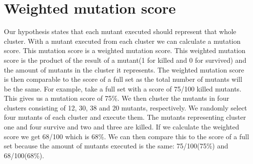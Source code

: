 \documentclass[../main]{subfiles}
\begin{document}
\section{Weighted mutation score}
\label{ch:weighted_score}
Our hypothesis states that each mutant executed should represent that whole cluster.
With a mutant executed from each cluster we can calculate a mutation score.
This mutation score is a weighted mutation score.
This weighted mutation score is the product of the result of a mutant(1 for killed and 0 for survived) and the amount of mutants in the cluster it represents.
The weighted mutation score is then comparable to the score of a full set as the total number of mutants will be the same.
\newline
For example, take a full set with a score of 75/100 killed mutants.
This gives us a mutation score of 75\%. 
We then cluster the mutants in four clusters consisting of 12, 30, 38 and 20 mutants, respectively.
We randomly select four mutants of each cluster and execute them.
The mutants representing cluster one and four survive and two and three are killed.
If we calculate the weighted score we get 68/100 which is 68\%.
We can then compare this to the score of a full set because the amount of mutants executed is the same: 75/100(75\%) and 68/100(68\%).
\end{document}
